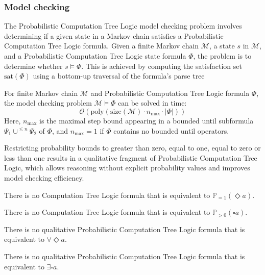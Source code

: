 \subsubsection{Model checking}
The Probabilistic Computation Tree Logic model checking problem involves determining if a given state in a Markov chain satisfies a Probabilistic Computation Tree Logic formula. 
Given a finite Markov chain $\mathcal{M}$, a state $s$ in $\mathcal{M}$, and a Probabilistic Computation Tree Logic state formula $\Phi$, the problem is to determine whether $s \models \Phi$.
This is achieved by computing the satisfaction set $\text{sat}(\Phi)$ using a bottom-up traversal of the formula's parse tree
\begin{theorem}
    For finite Markov chain $\mathcal{M}$ and Probabilistic Computation Tree Logic formula $\Phi$, the model checking problem $\mathcal{M} \models \Phi$ can be solved in time: 
    \[\mathcal{O}\left(\text{poly}\left(\text{size}\left(\mathcal{M}\right)\cdot n_{\max}\cdot\left\lvert \Phi\right\rvert\right)\right)\]
    Here, $n_{\max}$ is the maximal step bound appearing in a bounded until subformula $\Psi_1\cup^{\leq n}\Psi_2$ of $\Phi$, and $n_{\max}=1$ if $\Phi$ contains no bounded until operators.
\end{theorem}
Restricting probability bounds to greater than zero, equal to one, equal to zero or less than one results in a qualitative fragment of Probabilistic Computation Tree Logic, which allows reasoning without explicit probability values and improves model checking efficiency.
\begin{property}
    There is no Computation Tree Logic formula that is equivalent to $\mathbb{P}_{=1}(\Diamond a)$.
\end{property}
\begin{property}
    There is no Computation Tree Logic formula that is equivalent to $\mathbb{P}_{>0}(\square a)$.
\end{property}
\begin{property}
    There is no qualitative Probabilistic Computation Tree Logic formula that is equivalent to $\forall\Diamond a$. 
\end{property}
\begin{property}
    There is no qualitative Probabilistic Computation Tree Logic formula that is equivalent to $\exists\square a$.
\end{property}

